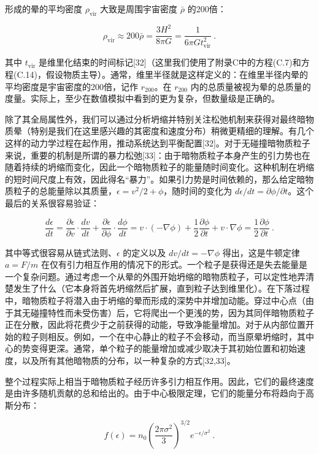 形成的晕的平均密度 \(\rho_{\text{vir}}\) 大致是周围宇宙密度 \(\bar{\rho}\) 的200倍：

\[ \rho_{\text{vir}} \approx 200 \bar{\rho} = \frac{3H^2}{8\pi G} = \frac{1}{6\pi G t^2_{\text{vir}}}~. \]

其中 \(t_{\text{vir}}\) 是维里化结束的时间标记[32]（这里我们使用了附录C中的方程(C.7)和方程(C.14)，假设物质主导）。通常，维里半径就是这样定义的：在维里半径内晕的平均密度是宇宙密度的200倍，记作 \(r_{200}\)。在 \(r_{200}\) 内的总质量被视为晕的总质量的度量。实际上，至少在数值模拟中看到的更为复杂，但数量级是正确的。

除了其全局属性外，我们可以通过分析坍缩并特别关注松弛机制来获得对最终暗物质晕（特别是我们在这里感兴趣的其密度和速度分布）稍微更精细的理解。有几个这样的动力学过程在起作用，推动系统达到平衡配置[32]。对于无碰撞暗物质粒子来说，重要的机制是所谓的暴力松弛[33]：由于暗物质粒子本身产生的引力势也在随着持续的坍缩而变化，因此一个暗物质粒子的能量随时间变化。这种机制在坍缩的短时间尺度上有效，因此得名“暴力”。如果引力势是时间依赖的，那么给定暗物质粒子的总能量除以其质量，\(\epsilon = v^2/2 + \phi\)，随时间的变化为 \(d\epsilon/dt = \partial\phi/\partial t\)。这个最后的关系很容易验证：

\[ \frac{d\epsilon}{dt} = \frac{\partial\epsilon}{\partial v} \cdot \frac{dv}{dt} + \frac{\partial\epsilon}{\partial\phi} \cdot \frac{d\phi}{dt} = v \cdot (-\nabla\phi) + \frac{1}{2} \frac{\partial\phi}{\partial t} + v \cdot \nabla\phi = \frac{1}{2} \frac{\partial\phi}{\partial t}~. \]

其中等式很容易从链式法则、\(\epsilon\) 的定义以及 \(dv/dt = -\nabla\phi\) 得出，这是牛顿定律 \(a = F/m\) 在仅有引力相互作用的情况下的形式。一个粒子是获得还是失去能量是一个复杂问题。通过考虑一个从晕的外围开始坍缩的暗物质粒子，可以定性地弄清楚发生了什么（它本身将首先坍缩然后扩展，直到粒子达到维里化）。在下落过程中，暗物质粒子将潜入由于坍缩的晕而形成的深势中并增加动能。穿过中心点（由于其无碰撞特性而未受伤害）后，它将爬出一个更浅的势，因为其同伴暗物质粒子正在分散，因此将花费少于之前获得的动能，导致净能量增加。对于从内部位置开始的粒子则相反。例如，一个在中心静止的粒子不会移动，而当原晕坍缩时，其中心的势变得更深。通常，单个粒子的能量增加或减少取决于其初始位置和初始速度，以及所有其他暗物质的分布，以一种复杂的方式[32,33]。

整个过程实际上相当于暗物质粒子经历许多引力相互作用。因此，它们的最终速度是由许多随机贡献的总和给出的。由于中心极限定理，它们的能量分布将趋向于高斯分布：

\[ f(\epsilon) = n_0 \left(\frac{2\pi\sigma^2}{3}\right)^{3/2} e^{-\epsilon/\sigma^2} ~. \]

